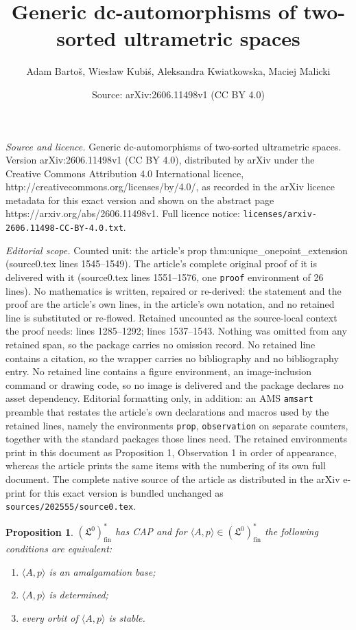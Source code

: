 \documentclass[10pt,a4paper]{amsart}
\title{Generic dc-automorphisms of two-sorted ultrametric spaces}
\author{Adam Barto\v{s}, Wies{\l}aw Kubi\'s, Aleksandra Kwiatkowska, Maciej Malicki}
\date{Source: arXiv:2606.11498v1 (CC BY 4.0)}
\newtheorem{prop}{Proposition}
\newcommand \Lin {\mathfrak{L}}
\newcommand \fin {{\operatorname{fin}}}
\newcommand \seq [1]{\langle #1 \rangle}
\begin{document}
\maketitle

\noindent\emph{Source and licence.} Generic dc-automorphisms of two-sorted ultrametric spaces. Version arXiv:2606.11498v1 (CC BY 4.0), distributed by arXiv under the Creative Commons Attribution 4.0 International licence, http://creativecommons.org/licenses/by/4.0/, as recorded in the arXiv licence metadata for this exact version and shown on the abstract page https://arxiv.org/abs/2606.11498v1. Full licence notice: \texttt{licenses/arxiv-2606.11498-CC-BY-4.0.txt}.\par\smallskip

\noindent\textit{Editorial scope.} Counted unit: the article's prop thm:unique\_onepoint\_extension (source0.tex lines 1545--1549). The article's complete original proof of it is delivered with it (source0.tex lines 1551--1576, one \texttt{proof} environment of 26 lines). No mathematics is written, repaired or re-derived: the statement and the proof are the article's own lines, in the article's own notation, and no retained line is substituted or re-flowed.  Retained uncounted as the source-local context the proof needs: lines 1285--1292; lines 1537--1543.  Nothing was omitted from any retained span, so the package carries no omission record.  No retained line contains a citation, so the wrapper carries no bibliography and no bibliography entry.  No retained line contains a figure environment, an image-inclusion command or drawing code, so no image is delivered and the package declares no asset dependency.  Editorial formatting only, in addition: an AMS \texttt{amsart} preamble that restates the article's own declarations and macros used by the retained lines, namely the environments \texttt{prop}, \texttt{observation} on separate counters, together with the standard packages those lines need.  The retained environments print in this document as Proposition 1, Observation 1 in order of appearance, whereas the article prints the same items with the numbering of its own full document.  The complete native source of the article as distributed in the arXiv e-print for this exact version is bundled unchanged as \texttt{sources/202555/source0.tex}.
\begin{prop}\label{lo_totaliz}
    $(\Lin^0)^*_\fin$  has CAP and for $\seq{A,p}\in (\Lin^0)^*_\fin$ the following conditions are equivalent:
    \begin{enumerate}[label={\rm(\alph*)}]
        \item $\seq{A,p}$ is an amalgamation base;
        \item $\seq{A,p}$ is determined;  
        \item every orbit of $\seq{A,p}$ is stable.
    \end{enumerate}
\end{prop}
\end{document}
